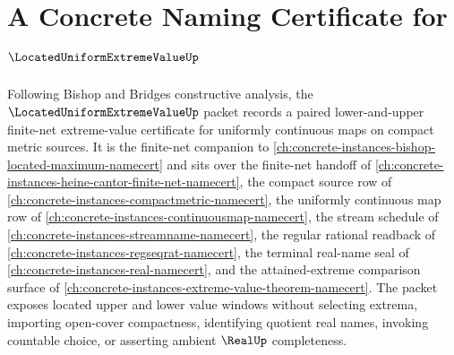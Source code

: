\chapter{A Concrete Naming Certificate for $\LocatedUniformExtremeValueUp$}
\label{ch:concrete-instances-located-uniform-extreme-value-namecert}

Following Bishop and Bridges constructive analysis, the $\LocatedUniformExtremeValueUp$ packet records a paired lower-and-upper finite-net extreme-value certificate for uniformly continuous maps on compact metric sources. It is the finite-net companion to \autoref{ch:concrete-instances-bishop-located-maximum-namecert} and sits over the finite-net handoff of \autoref{ch:concrete-instances-heine-cantor-finite-net-namecert}, the compact source row of \autoref{ch:concrete-instances-compactmetric-namecert}, the uniformly continuous map row of \autoref{ch:concrete-instances-continuousmap-namecert}, the stream schedule of \autoref{ch:concrete-instances-streamname-namecert}, the regular rational readback of \autoref{ch:concrete-instances-regseqrat-namecert}, the terminal real-name seal of \autoref{ch:concrete-instances-real-namecert}, and the attained-extreme comparison surface of \autoref{ch:concrete-instances-extreme-value-theorem-namecert}. The packet exposes located upper and lower value windows without selecting extrema, importing open-cover compactness, identifying quotient real names, invoking countable choice, or asserting ambient $\RealUp$ completeness.

